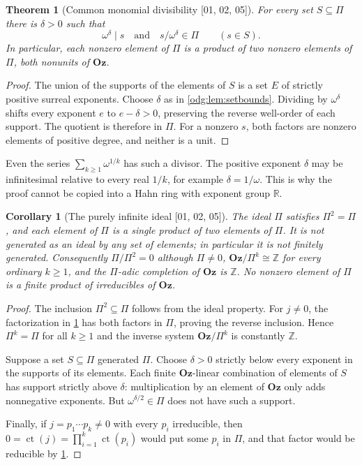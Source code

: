 \documentclass[11pt,oneside]{article}
\numberwithin{equation}{section}
\newtheorem{theorem}{Theorem}[section]
\newtheorem{corollary}[corollary]{Corollary}
\theoremstyle{definition}
\theoremstyle{remark}
\newcommand{\Oz}{\mathbf{Oz}}
\newcommand{\Z}{\mathbb Z}
\newcommand{\R}{\mathbb R}
\newcommand{\ct}{\operatorname{ct}}
\newcommand{\src}[1]{\textup{\textsf{\small[#1]}}}
\begin{document}
\begin{theorem}[Common monomial divisibility \src{01, 02, 05}]\label{odg:thm:commondivisor}
For every set $S\subseteq\Pi$ there is $\delta>0$ such that
\[
 \omega^\delta\mid s\quad\text{and}\quad
 s/\omega^\delta\in\Pi\qquad(s\in S).
\]
In particular, each nonzero element of $\Pi$ is a product of two nonzero
elements of $\Pi$, both nonunits of $\Oz$.
\end{theorem}
\begin{proof}
The union of the supports of the elements of $S$ is a set $E$ of strictly
positive surreal exponents. Choose $\delta$ as in
\cref{odg:lem:setbounds}. Dividing by $\omega^\delta$ shifts every exponent
$e$ to $e-\delta>0$, preserving the reverse well-order of each support.
The quotient is therefore in $\Pi$. For a nonzero $s$, both factors are
nonzero elements of positive degree, and neither is a unit.
\end{proof}

Even the series $\sum_{k\geq1}\omega^{1/k}$ has such a divisor. The
positive exponent $\delta$ may be infinitesimal relative to every real
$1/k$, for example $\delta=1/\omega$. This is why the proof cannot be copied
into a Hahn ring with exponent group $\R$.

\begin{corollary}[The purely infinite ideal \src{01, 02, 05}]\label{odg:cor:Pglobal}\label{odg:cor:Jglobal}
The ideal $\Pi$ satisfies $\Pi^2=\Pi$, and each element of $\Pi$ is a single
product of two elements of $\Pi$. It is not generated as an ideal by any set
of elements; in particular it is not finitely generated. Consequently
$\Pi/\Pi^2=0$ although $\Pi\ne0$, $\Oz/\Pi^k\cong\Z$ for every ordinary
$k\ge1$, and the $\Pi$-adic completion of $\Oz$ is $\Z$. No nonzero element
of $\Pi$ is a finite product of irreducibles of $\Oz$.
\end{corollary}
\begin{proof}
The inclusion $\Pi^2\subseteq\Pi$ follows from the ideal property. For
$j\ne0$, the factorization in \cref{odg:thm:commondivisor} has both factors
in $\Pi$, proving the reverse inclusion. Hence $\Pi^k=\Pi$ for all $k\ge1$ and
the inverse system $\Oz/\Pi^k$ is constantly $\Z$.

Suppose a set $S\subseteq\Pi$ generated $\Pi$. Choose $\delta>0$
strictly below every exponent in the supports of its elements. Each finite
$\Oz$-linear combination of elements of $S$ has support strictly above
$\delta$: multiplication by an element of $\Oz$ only adds nonnegative
exponents. But $\omega^{\delta/2}\in\Pi$ does not have such a support.

Finally, if $j=p_1\cdots p_k\ne0$ with every $p_i$ irreducible, then
$0=\ct(j)=\prod_{i=1}^k\ct(p_i)$ would put some $p_i$ in $\Pi$, and that
factor would be reducible by \cref{odg:thm:commondivisor}.
\end{proof}
\end{document}
